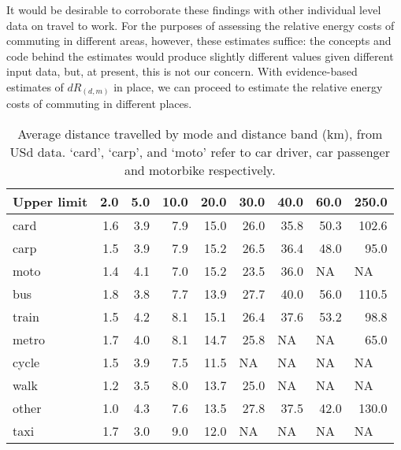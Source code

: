 It would be desirable to corroborate these findings with other individual level
data on travel to work. For the purposes of assessing the relative energy
costs of commuting in different areas, however, these estimates suffice:
the concepts and code behind the estimates would produce slightly different
values given different input data, but, at present, this is not our concern.
With evidence-based estimates of $dR_{(d,m)}$ in place,
we can proceed to estimate the relative energy costs of commuting in different
places. 

\begin{table}[htbp]
\caption[Average distance travelled by mode and distance band]
{Average distance travelled by mode and distance band (km),
from USd data. `card', `carp', and `moto' refer to
car driver, car passenger and motorbike respectively.}\label{tdboxes}
\begin{center}
\begin{tabular}{lrrrrrrrr}
\toprule
Upper limit & 2.0 & 5.0 & 10.0 & 20.0 & 30.0 & 40.0 & 60.0 & 250.0 \\ \midrule
card & 1.6 & 3.9 & 7.9 & 15.0 & 26.0 & 35.8 & 50.3 & 102.6 \\
carp & 1.5 & 3.9 & 7.9 & 15.2 & 26.5 & 36.4 & 48.0 & 95.0 \\
moto & 1.4 & 4.1 & 7.0 & 15.2 & 23.5 & 36.0 & \multicolumn{1}{l}{NA} & \multicolumn{1}{l}{NA} \\
bus & 1.8 & 3.8 & 7.7 & 13.9 & 27.7 & 40.0 & 56.0 & 110.5 \\
train & 1.5 & 4.2 & 8.1 & 15.1 & 26.4 & 37.6 & 53.2 & 98.8 \\
metro & 1.7 & 4.0 & 8.1 & 14.7 & 25.8 & \multicolumn{1}{l}{NA} & \multicolumn{1}{l}{NA} & 65.0 \\
cycle & 1.5 & 3.9 & 7.5 & 11.5 & \multicolumn{1}{l}{NA} & \multicolumn{1}{l}{NA} & \multicolumn{1}{l}{NA} & \multicolumn{1}{l}{NA} \\
walk & 1.2 & 3.5 & 8.0 & 13.7 & 25.0 & \multicolumn{1}{l}{NA} & \multicolumn{1}{l}{NA} & \multicolumn{1}{l}{NA} \\
other & 1.0 & 4.3 & 7.6 & 13.5 & 27.8 & 37.5 & 42.0 & 130.0 \\
taxi & 1.7 & 3.0 & 9.0 & 12.0 & \multicolumn{1}{l}{NA} & \multicolumn{1}{l}{NA} & \multicolumn{1}{l}{NA} & \multicolumn{1}{l}{NA} \\
\bottomrule
\end{tabular}
\end{center}
\end{table}

